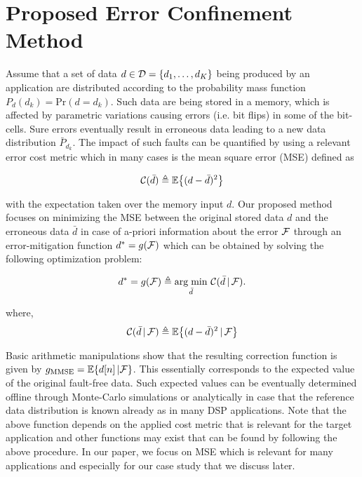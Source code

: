 \section{Proposed Error Confinement Method} \label{sec:theory}
Assume that a set of data $d \in \mathcal{D} = \{d_1, \ldots, d_K\}$ being produced by an application are distributed according to the probability mass function $P_d(d_k) = \mathrm{Pr}(d=d_k)$. 
Such data are being stored in a memory, which is affected by parametric variations causing errors (i.e. bit flips) 
in some of the bit-cells. Sure errors eventually result in erroneous data leading to a new data distribution $\bar{P}_{d_k}$. 
The impact of such faults can be quantified by using a relevant error cost metric which in 
many cases is the mean square error (MSE) defined as  

\begin{equation}
      \mathcal{C}(\bar{d}) \triangleq \mathbb{E} \big\{ (d-\bar{d})^2 \big\}
\end{equation}

with the expectation taken over the memory input $d$. Our proposed method focuses on minimizing the MSE between the original stored data $d$ and the erroneous data $\bar{d}$ in case of a-priori information about the error $\mathcal{F}$ through an error-mitigation function  $d^* = g(\mathcal{F})$ which can be obtained by solving the following optimization problem:

\begin{equation}
    \label{eq:corrFunc}
    d^* = g(\setF) \triangleq \argmin_{\bar{d}} \, \setC(\bar{d} \, | \, \setF).
\end{equation}

where, 
\begin{equation}
    \label{eq:corrFuncMMSE}
    \setC(\bar{d} \, | \, \setF) \triangleq \mathbb{E}\big\{ (d-\bar{d})^2 \, | \, \setF  \big\}
\end{equation}

Basic arithmetic manipulations show that the resulting correction function is given by 
 $g_\text{MMSE} = \mathbb{E}\{d[n] \, | \mathcal{F}\}$. This essentially corresponds to the expected value of the original fault-free data. Such expected values can be eventually determined offline through Monte-Carlo simulations 
or analytically in case that the reference data distribution is known already as in many DSP applications.  
Note that the above function depends on the applied cost metric that is relevant 
for the target application and other functions may exist that can be found by following the above procedure. 
In our paper, we focus on MSE which is relevant for many applications and especially for our case study that we discuss later.
  
